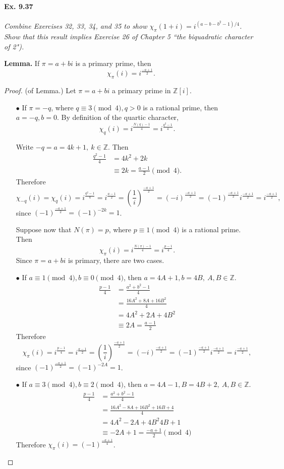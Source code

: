\documentclass[11pt,a4paper]{article}
\newcommand{\Z}{\mathbb{Z}}
\begin{document}
\paragraph{Ex. 9.37}

{\it Combine Exercises 32, 33, 34, and 35 to show $\chi_\pi(1+i) = i^{(a-b-b^2-1)/4}$. Show that this result implies Exercise 26 of Chapter 5 ``the biquadratic character of 2").
}

\bigskip

{\bf Lemma.} If $\pi = a +bi$ is a primary prime, then $$\chi_\pi(i) = i^\frac{-a+1}{2}.$$

\begin{proof}{(of Lemma.)}
Let $\pi = a +bi$ a primary prime in $\Z[i]$.
\begin{enumerate}
\item[$\bullet$] If $\pi = -q$, where $q \equiv 3 \pmod 4, q>0$ is a rational prime, then $a= -q, b=0$. By definition of the quartic character,
$$\chi_q(i) = i^\frac{N(q) - 1}{4} = i^\frac{q^2-1}{4}.$$

Write $-q = a = 4k+1,\ k \in \Z$. Then
\begin{align*}
\frac{q^2-1}{4} &= 4k^2 + 2k\\
&\equiv 2k  =\frac{a-1}{2}\pmod 4.
\end{align*}
Therefore $$\chi_{-q}(i)  = \chi_{q}(i) = i^{\frac{q^2-1}{4}} = i^\frac{a-1}{2} = \left(\frac{1}{i}\right)^\frac{-a+1}{2}= (-i)^\frac{-a+1}{2} =  (-1)^\frac{-a+1}{2} i ^\frac{-a+1}{2} = i ^\frac{-a+1}{2},$$
since $(-1)^\frac{-a+1}{2} = (-1)^{-2k} = 1$.

Suppose now that $N(\pi) = p$, where $p\equiv 1 \pmod 4$ is a rational prime. Then 
$$\chi_\pi(i) = i^\frac{N(\pi)-1}{4} = i^\frac{p-1}{4}.$$
 Since $\pi = a + bi$ is primary, there are two cases.
\item[$\bullet$] If $a\equiv 1 \pmod 4, b \equiv 0 \pmod 4$, then $a = 4A + 1, b = 4B,\ A,B \in \Z$.
\begin{align*}
\frac{p-1}{4} &= \frac{a^2+b^2-1}{4}\\
&=\frac{16 A^2 +8A + 16 B^2}{4}\\
&=4A^2 +2A + 4B^2\\
&\equiv 2A  = \frac{a-1}{2}
\end{align*}
Therefore $$\chi_{\pi}(i) = i^{\frac{p-1}{4}} = i^{\frac{a-1}{2}} = \left(\frac{1}{i}\right)^\frac{-a+1}{2}= (-i)^\frac{-a+1}{2} =  (-1)^\frac{-a+1}{2} i ^\frac{-a+1}{2} = i ^\frac{-a+1}{2},$$
since $(-1)^\frac{-a+1}{2} = (-1)^{-2A} = 1$.

\item[$\bullet$] If $a\equiv 3\pmod 4, b \equiv 2 \pmod 4$, then $a = 4A -1, B = 4B+2,\ A,B\in \Z$.
\begin{align*}
\frac{p-1}{4} &= \frac{a^2+b^2-1}{4}\\
&=\frac{16 A^2 - 8A + 16 B^2+ 16B +4}{4}\\
&= 4A^2 - 2A + 4B^2 4B+1\\
&\equiv -2A + 1  = \frac{-a+1}{2} \pmod 4
\end{align*}
Therefore $\chi_\pi(i) = (-1)^\frac{-a+1}{4}$.


\end{enumerate}
\end{proof}
\end{document}
